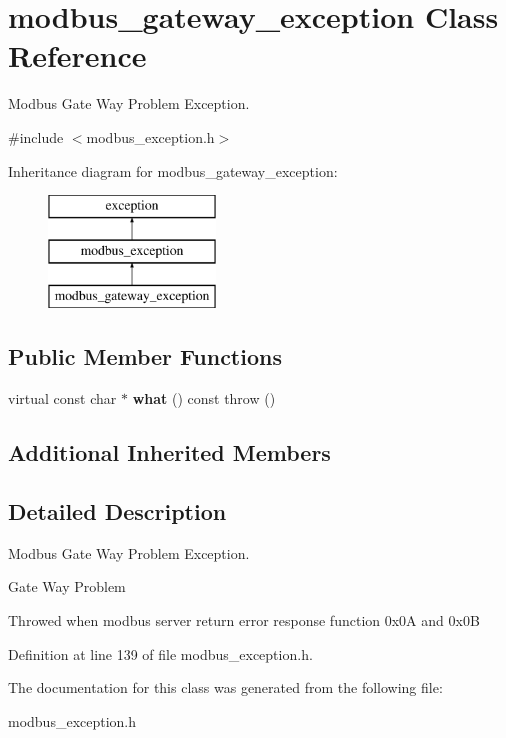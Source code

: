 \hypertarget{classmodbus__gateway__exception}{}\section{modbus\+\_\+gateway\+\_\+exception Class Reference}
\label{classmodbus__gateway__exception}


Modbus Gate Way Problem Exception.  




{\ttfamily \#include $<$modbus\+\_\+exception.\+h$>$}

Inheritance diagram for modbus\+\_\+gateway\+\_\+exception\+:\begin{figure}[H]
\begin{center}
\leavevmode
\includegraphics[height=3.000000cm]{classmodbus__gateway__exception}
\end{center}
\end{figure}
\subsection*{Public Member Functions}
\begin{DoxyCompactItemize}
\item 
\mbox{\label{classmodbus__gateway__exception_a8cab9924e8f3879a50ce0ad58197bc24}} 
virtual const char $\ast$ {\bfseries what} () const  throw ()
\end{DoxyCompactItemize}
\subsection*{Additional Inherited Members}


\subsection{Detailed Description}
Modbus Gate Way Problem Exception. 

Gate Way Problem

Throwed when modbus server return error response function 0x0A and 0x0B 

Definition at line 139 of file modbus\+\_\+exception.\+h.



The documentation for this class was generated from the following file\+:\begin{DoxyCompactItemize}
\item 
modbus\+\_\+exception.\+h\end{DoxyCompactItemize}

